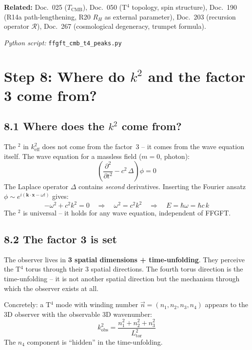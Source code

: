 \noindent\textbf{Related:} Doc.~025 ($T_\mathrm{CMB}$),
Doc.~050 (T$^4$ topology, spin structure),
Doc.~190 (R14a path-lengthening, R20 $R_H$ as external parameter),
Doc.~203 (recursion operator $\mathcal{R}$),
Doc.~267 (cosmological degeneracy, trumpet formula).

\noindent\emph{Python script:} \texttt{ffgft\_cmb\_t4\_peaks.py}

\section{Step 8: Where do $k^2$ and the factor 3 come from?}

\subsection*{8.1 Where does the $k^2$ come from?}

The $^2$ in $k_\mathrm{eff}^2$ does not come from the factor~3 --
it comes from the wave equation itself.
The wave equation for a massless field ($m=0$, photon):
\[
  \left(\frac{\partial^2}{\partial t^2} - c^2\,\Delta\right)\phi = 0
\]
The Laplace operator $\Delta$ contains \emph{second} derivatives.
Inserting the Fourier ansatz $\phi \sim e^{i(\mathbf{k}\cdot\mathbf{x}-\omega t)}$
gives:
\[
  -\omega^2 + c^2 k^2 = 0
  \quad\Rightarrow\quad
  \omega^2 = c^2 k^2
  \quad\Rightarrow\quad
  E = \hbar\omega = \hbar c\,k
\]
The $^2$ is universal -- it holds for any wave equation,
independent of FFGFT.

\subsection*{8.2 The factor 3 is set}

The observer lives in \textbf{3 spatial dimensions + time-unfolding}.
They perceive the T$^4$ torus through their 3 spatial directions.
The fourth torus direction is the time-unfolding -- it is not
another spatial direction but the mechanism through which the
observer exists at all.

Concretely: a T$^4$ mode with winding number
$\vec{n} = (n_1, n_2, n_3, n_4)$ appears to the 3D observer
with the observable 3D wavenumber:
\[
  k_\mathrm{obs}^2 = \frac{n_1^2 + n_2^2 + n_3^2}{L_\mathrm{tor}^2}
\]
The $n_4$ component is ``hidden'' in the time-unfolding.


